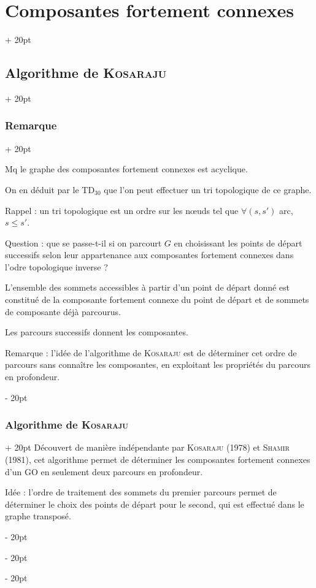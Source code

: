 \documentclass[a4paper, 12pt, twoside]{article}
\renewcommand{\le}{\leqslant}
\newcommand{\ind}[1][20pt]{\advance\leftskip + #1}
\newcommand{\deind}[1][20pt]{\advance\leftskip - #1}
\newenvironment{indt}[2][20pt]{#2 \par \ind[#1]}{\par \deind} %
\begin{document}
\begin{indt}{\section{Composantes fortement connexes}}
\begin{indt}{\subsection{Algorithme de \textsc{Kosaraju}}}
\begin{indt}{\subsubsection{Remarque}}
                \vspace{12pt}
                
                 Mq le graphe des composantes fortement connexes est acyclique.

                \vspace{12pt}
                
                On en déduit par le TD$_{30}$ que l'on peut effectuer un tri topologique de ce graphe.

                Rappel : un tri topologique est un ordre sur les n\oe uds tel que $\forall (s, s')$ arc, $s \le s'$.

                \vspace{6pt}
                
                Question : que se passe-t-il si on parcourt $G$ en choisissant les points de départ successifs selon leur appartenance aux composantes fortement connexes dans l'odre topologique inverse ?

                L'ensemble des sommets accessibles à partir d'un point de départ donné est constitué de la composante fortement connexe du point de départ et de sommets de composante déjà parcourus.

                Les parcours successifs donnent les composantes.

                Remarque :
                l'idée de l'algorithme de \textsc{Kosaraju} est de déterminer cet ordre de parcours sans connaître les composantes, en exploitant les propriétés du parcours en profondeur.
            \end{indt}

            \vspace{12pt}
            
            \begin{indt}{\subsubsection{Algorithme de \textsc{Kosaraju}}}
                Découvert de manière indépendante par \textsc{Kosaraju} (1978) et \textsc{Shamir} (1981), cet algorithme permet de déterminer les composantes fortement connexes d'un GO en seulement deux parcours en profondeur.

                Idée : l'ordre de traitement des sommets du premier parcours permet de déterminer le choix des points de départ pour le second, qui est effectué dans le graphe transposé.


\end{indt}
\end{indt}
\end{indt}
\end{document}
